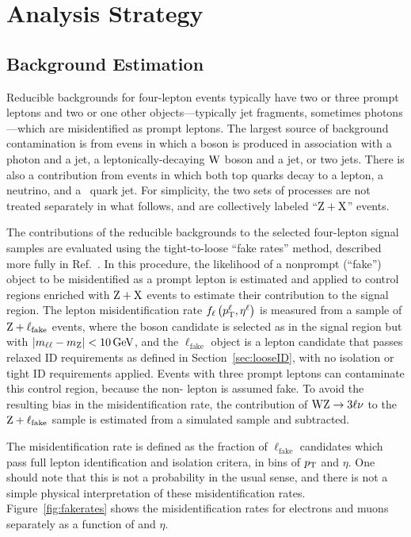 
\chapter{Analysis Strategy}

\section{Background Estimation}
Reducible backgrounds for four-lepton events typically have two or three prompt leptons and two or one other objects---typically jet fragments, sometimes photons---which are misidentified as prompt leptons.
The largest source of background contamination is from evens in which a {\PZ} boson is produced in association with a photon and a jet, a leptonically-decaying $\mathrm{W}$ boson and a jet, or two jets.
There is also a contribution from {\TTbar} events in which both top quarks decay to a lepton, a neutrino, and a {\Pqb}~quark jet.
For simplicity, the two sets of processes are not treated separately in what follows, and are collectively labeled ``$\mathrm{Z}+\mathrm{X}$'' events.

The contributions of the reducible backgrounds to the selected four-lepton signal samples are evaluated using the tight-to-loose ``fake rates'' method, described more fully in Ref.~\cite{Chatrchyan:2013mxa}.
In this procedure, the likelihood of a nonprompt (``fake'') object to be misidentified as a prompt lepton is estimated and applied to control regions enriched with $\mathrm{Z}+\mathrm{X}$ events to estimate their contribution to the signal region.
The lepton misidentification rate $f_\ell\left(p_\mathrm{T}^\ell, \eta^\ell\right)$ is measured from a sample of $\mathrm{Z} + \ell_\text{fake}$ events, where the {\PZ} boson candidate is selected as in the signal region but with $\left| m_{\ell\ell} - m_\mathrm{Z} \right| < 10\,\mathrm{Ge\hspace{-.08em}V}$, and the $\ell_\text{fake}$ object is a lepton candidate that passes relaxed ID requirements as defined in Section~\ref{sec:looseID}, with no isolation or tight ID requirements applied.
Events with three prompt leptons can contaminate this control region, because the {non-\PZ} lepton is assumed fake.
To avoid the resulting bias in the misidentification rate, the contribution of $\mathrm{W}\mathrm{Z} \to 3\ell\nu$ to the $\mathrm{Z}+\ell_\text{fake}$ sample is estimated from a simulated sample and subtracted.

The misidentification rate is defined as the fraction of $\ell_\text{fake}$ candidates which pass full lepton identification and isolation critera, in bins of $p_\mathrm{T}$ and $\eta$.
One should note that this is not a probability in the usual sense, and there is not a simple physical interpretation of these misidentification rates.
Figure~\ref{fig:fakerates} shows the misidentification rates for electrons and muons separately as a function of {\pt} and $\eta$.

